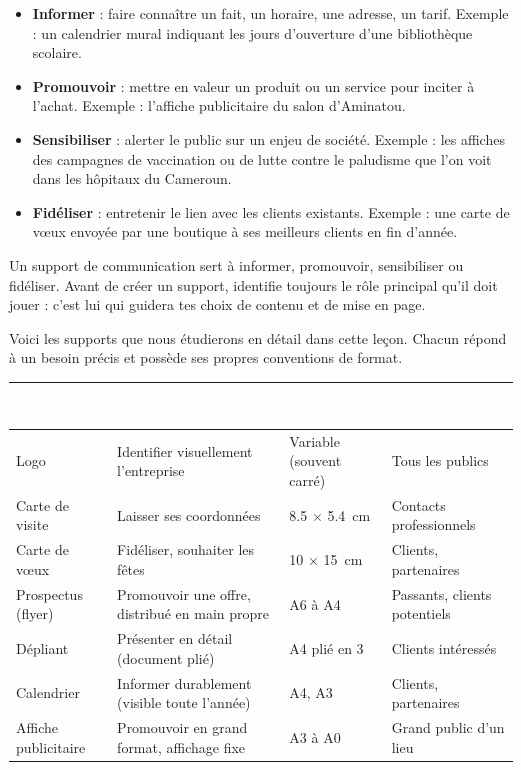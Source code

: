 \documentclass[11pt]{article}
\newcommand{\cle}[1]{{\popxbold\color{popdark}#1}}
\newcounter{popsec}
\newcounter{popsub}
\newcommand{\courssub}[1]{%
  \stepcounter{popsub}%
  \par\vspace{9pt}\noindent{\popxbold\fontsize{11.5}{13}\selectfont\color{popink}{\color{poporange}\thepopsec.\thepopsub}\hspace{6pt}#1}\par\nopagebreak\vspace{4pt}
}
\begin{document}
\begin{itemize}
  \item \textbf{Informer} : faire connaître un fait, un horaire, une adresse, un tarif. Exemple : un calendrier mural indiquant les jours d'ouverture d'une bibliothèque scolaire.
  \item \textbf{Promouvoir} : mettre en valeur un produit ou un service pour inciter à l'achat. Exemple : l'affiche publicitaire du salon d'Aminatou.
  \item \textbf{Sensibiliser} : alerter le public sur un enjeu de société. Exemple : les affiches des campagnes de vaccination ou de lutte contre le paludisme que l'on voit dans les hôpitaux du Cameroun.
  \item \textbf{Fidéliser} : entretenir le lien avec les clients existants. Exemple : une carte de vœux envoyée par une boutique à ses meilleurs clients en fin d'année.
\end{itemize}

\begin{aretenir}
Un support de communication sert à \cle{informer}, \cle{promouvoir}, \cle{sensibiliser} ou \cle{fidéliser}. Avant de créer un support, identifie toujours le rôle principal qu'il doit jouer : c'est lui qui guidera tes choix de contenu et de mise en page.
\end{aretenir}

\courssub{Panorama des supports imprimés}

Voici les supports que nous étudierons en détail dans cette leçon. Chacun répond à un besoin précis et possède ses propres conventions de format.

\begin{center}
\begin{tabularx}{\linewidth}{|l|X|l|X|}
\hline
\rowcolor{popblue} \textcolor{white}{\textbf{Support}} & \textcolor{white}{\textbf{Objectif principal}} & \textcolor{white}{\textbf{Format usuel}} & \textcolor{white}{\textbf{Public cible}} \\
\hline
Logo & Identifier visuellement l'entreprise & Variable (souvent carré) & Tous les publics \\
\hline
Carte de visite & Laisser ses coordonnées & \num{8,5} $\times$ \num{5,4}~cm & Contacts professionnels \\
\hline
Carte de vœux & Fidéliser, souhaiter les fêtes & \num{10} $\times$ \num{15}~cm & Clients, partenaires \\
\hline
Prospectus (flyer) & Promouvoir une offre, distribué en main propre & A6 à A4 & Passants, clients potentiels \\
\hline
Dépliant & Présenter en détail (document plié) & A4 plié en 3 & Clients intéressés \\
\hline
Calendrier & Informer durablement (visible toute l'année) & A4, A3 & Clients, partenaires \\
\hline
Affiche publicitaire & Promouvoir en grand format, affichage fixe & A3 à A0 & Grand public d'un lieu \\
\hline
\end{tabularx}
\end{center}
\end{document}
